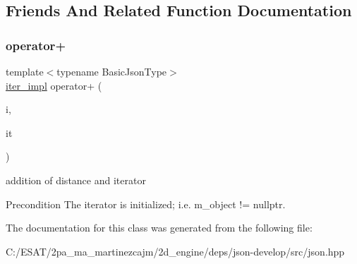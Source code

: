 \subsection{Friends And Related Function Documentation}
\mbox{\label{classnlohmann_1_1detail_1_1iter__impl_a94108d1a7563e103534f23eb5c1ee175}} 
\subsubsection{\texorpdfstring{operator+}{operator+}}
{\footnotesize\ttfamily template$<$typename Basic\+Json\+Type$>$ \\
\hyperlink{classnlohmann_1_1detail_1_1iter__impl}{iter\+\_\+impl} operator+ (\begin{DoxyParamCaption}\item[{\hyperlink{classnlohmann_1_1detail_1_1iter__impl_a2f7ea9f7022850809c60fc3263775840}{difference\+\_\+type}}]{i,  }\item[{const \hyperlink{classnlohmann_1_1detail_1_1iter__impl}{iter\+\_\+impl}$<$ Basic\+Json\+Type $>$ \&}]{it }\end{DoxyParamCaption})\hspace{0.3cm}{\ttfamily [friend]}}



addition of distance and iterator 

\begin{DoxyPrecond}{Precondition}
The iterator is initialized; i.\+e. {\ttfamily m\+\_\+object != nullptr}. 
\end{DoxyPrecond}


The documentation for this class was generated from the following file\+:\begin{DoxyCompactItemize}
\item 
C\+:/\+E\+S\+A\+T/2pa\+\_\+ma\+\_\+martinezcajm/2d\+\_\+engine/deps/json-\/develop/src/json.\+hpp\end{DoxyCompactItemize}
